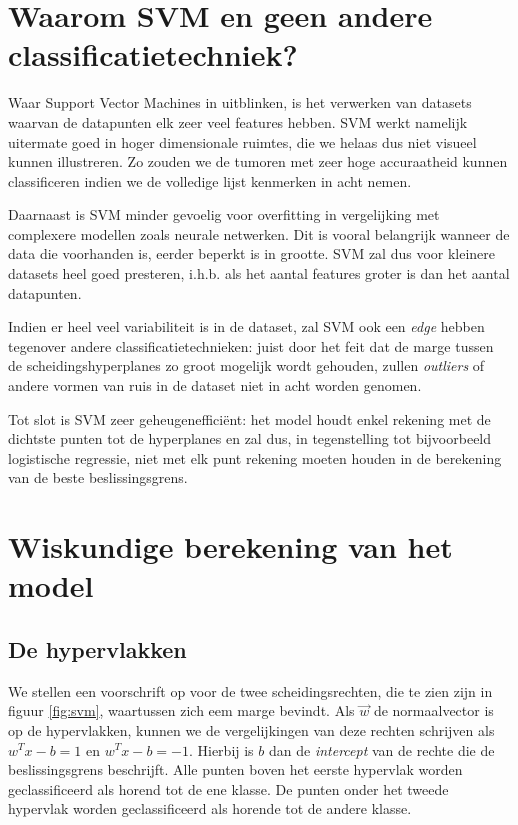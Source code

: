 \documentclass[TeamE-eindrapport]{subfiles}
\begin{document}
	\section{Waarom SVM en geen andere classificatietechniek?}
	
	Waar Support Vector Machines in uitblinken, is het verwerken van datasets waarvan de datapunten elk zeer veel features hebben. SVM werkt namelijk uitermate goed in hoger dimensionale ruimtes, die we helaas dus niet visueel kunnen illustreren. Zo zouden we de tumoren met zeer hoge accuraatheid kunnen classificeren indien we de volledige lijst kenmerken in acht nemen.
	
	Daarnaast is SVM minder gevoelig voor overfitting in vergelijking met complexere modellen zoals neurale netwerken. Dit is vooral belangrijk wanneer de data die voorhanden is, eerder beperkt is in grootte. SVM zal dus voor kleinere datasets heel goed presteren, i.h.b. als het aantal features groter is dan het aantal datapunten.
	
	Indien er heel veel variabiliteit is in de dataset, zal SVM ook een \textit{edge} hebben tegenover andere classificatietechnieken: juist door het feit dat de marge tussen de scheidingshyperplanes zo groot mogelijk wordt gehouden, zullen \textit{outliers} of andere vormen van ruis in de dataset niet in acht worden genomen.
	
	Tot slot is SVM zeer geheugenefficiënt: het model houdt enkel rekening met de dichtste punten tot de hyperplanes en zal dus, in tegenstelling tot bijvoorbeeld logistische regressie, niet met elk punt rekening moeten houden in de berekening van de beste beslissingsgrens.
	
	\section{Wiskundige berekening van het model}
	
	\subsection{De hypervlakken}
	
	We stellen een voorschrift op voor de twee scheidingsrechten, die te zien zijn in figuur \ref{fig:svm}, waartussen zich eem marge bevindt. Als \(\vec{w}\) de normaalvector is op de hypervlakken, kunnen we de vergelijkingen van deze rechten schrijven als \(w^Tx-b=1\) en \(w^Tx-b=-1\). Hierbij is \(b\) dan de \textit{intercept} van de rechte die de beslissingsgrens beschrijft. Alle punten boven het eerste hypervlak worden geclassificeerd als horend tot de ene klasse. De punten onder het tweede hypervlak worden geclassificeerd als horende tot de andere klasse.
	
\end{document}
